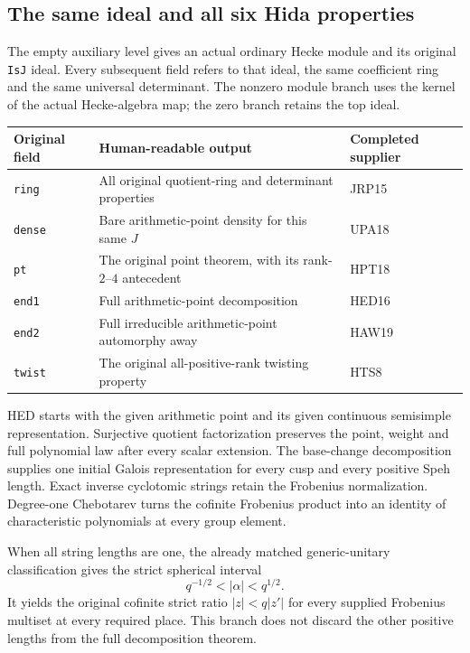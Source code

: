 \subsection{The same ideal and all six Hida properties}

The empty auxiliary level gives an actual ordinary Hecke module
and its original \texttt{IsJ} ideal.  Every subsequent field refers
to that ideal, the same coefficient ring and the same universal
determinant.  The nonzero module branch uses the kernel of the
actual Hecke-algebra map; the zero branch retains the top ideal.

\begin{center}
\begin{tabular}{@{}p{}p{}p{}@{}}
\toprule
Original field & Human-readable output & Completed supplier\\
\midrule
\texttt{ring} & All original quotient-ring and determinant properties & JRP15\\
\texttt{dense} & Bare arithmetic-point density for this same $J$ & UPA18\\
\texttt{pt} & The original point theorem, with its rank-$2$--$4$ antecedent & HPT18\\
\texttt{end1} & Full arithmetic-point decomposition & HED16\\
\texttt{end2} & Full irreducible arithmetic-point automorphy away & HAW19\\
\texttt{twist} & The original all-positive-rank twisting property & HTS8\\
\bottomrule
\end{tabular}
\end{center}

HED starts with the given arithmetic point and its given continuous
semisimple representation.  Surjective quotient factorization
preserves the point, weight and full polynomial law after every
scalar extension.  The base-change decomposition supplies one
initial Galois representation for every cusp and every positive
Speh length.  Exact inverse cyclotomic strings retain the
Frobenius normalization.  Degree-one Chebotarev turns the cofinite
Frobenius product into an identity of characteristic polynomials
at every group element.

When all string lengths are one, the already matched
generic-unitary classification gives the strict spherical interval
\[
                   q^{-1/2}<|\alpha|<q^{1/2}.
\]
It yields the original cofinite strict ratio
$|z|<q|z'|$ for every supplied Frobenius multiset at every required
place.  This branch does not discard the other positive lengths
from the full decomposition theorem.


